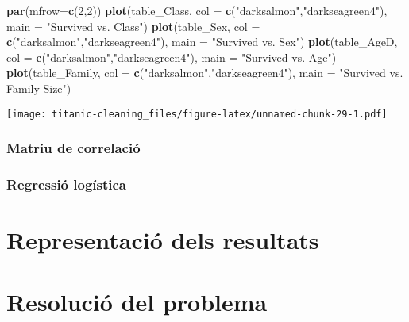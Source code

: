 \documentclass[]{article}
\newenvironment{Shaded}{\begin{snugshade}}{\end{snugshade}}
\newcommand{\DataTypeTok}[1]{\textcolor[rgb]{0.13,0.29,0.53}{#1}}
\newcommand{\DecValTok}[1]{\textcolor[rgb]{0.00,0.00,0.81}{#1}}
\newcommand{\KeywordTok}[1]{\textcolor[rgb]{0.13,0.29,0.53}{\textbf{#1}}}
\newcommand{\NormalTok}[1]{#1}
\newcommand{\StringTok}[1]{\textcolor[rgb]{0.31,0.60,0.02}{#1}}
\begin{document}
\begin{Shaded}
\begin{Highlighting}[]
\KeywordTok{par}\NormalTok{(}\DataTypeTok{mfrow=}\KeywordTok{c}\NormalTok{(}\DecValTok{2}\NormalTok{,}\DecValTok{2}\NormalTok{))}
\KeywordTok{plot}\NormalTok{(table_Class, }\DataTypeTok{col =} \KeywordTok{c}\NormalTok{(}\StringTok{"darksalmon"}\NormalTok{,}\StringTok{"darkseagreen4"}\NormalTok{), }\DataTypeTok{main =} \StringTok{"Survived vs. Class"}\NormalTok{)}
\KeywordTok{plot}\NormalTok{(table_Sex, }\DataTypeTok{col =} \KeywordTok{c}\NormalTok{(}\StringTok{"darksalmon"}\NormalTok{,}\StringTok{"darkseagreen4"}\NormalTok{), }\DataTypeTok{main =} \StringTok{"Survived vs. Sex"}\NormalTok{)}
\KeywordTok{plot}\NormalTok{(table_AgeD, }\DataTypeTok{col =} \KeywordTok{c}\NormalTok{(}\StringTok{"darksalmon"}\NormalTok{,}\StringTok{"darkseagreen4"}\NormalTok{), }\DataTypeTok{main =} \StringTok{"Survived vs. Age"}\NormalTok{)}
\KeywordTok{plot}\NormalTok{(table_Family, }\DataTypeTok{col =} \KeywordTok{c}\NormalTok{(}\StringTok{"darksalmon"}\NormalTok{,}\StringTok{"darkseagreen4"}\NormalTok{), }\DataTypeTok{main =} \StringTok{"Survived vs. Family Size"}\NormalTok{)}
\end{Highlighting}
\end{Shaded}

\texttt{[image: titanic-cleaning\_files/figure-latex/unnamed-chunk-29-1.pdf]}

\hypertarget{matriu-de-correlaciuxf3}{%
\subsubsection{Matriu de correlació}\label{matriu-de-correlaciuxf3}}

\hypertarget{regressiuxf3-loguxedstica}{%
\subsubsection{Regressió logística}\label{regressiuxf3-loguxedstica}}

\hypertarget{representaciuxf3-dels-resultats}{%
\section{Representació dels
resultats}\label{representaciuxf3-dels-resultats}}

\hypertarget{resoluciuxf3-del-problema}{%
\section{Resolució del problema}\label{resoluciuxf3-del-problema}}
\end{document}
